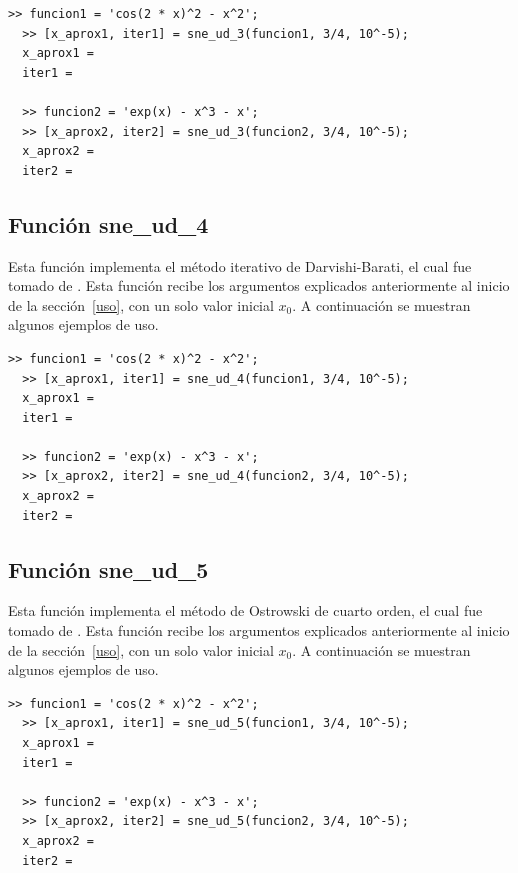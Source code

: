\documentclass[12pt]{article}
\begin{document}
\begin{minipage}{\linewidth}
\begin{lstlisting}[frame = single]
  >> funcion1 = 'cos(2 * x)^2 - x^2';
  >> [x_aprox1, iter1] = sne_ud_3(funcion1, 3/4, 10^-5);
  x_aprox1 = 
  iter1 = 

  >> funcion2 = 'exp(x) - x^3 - x';
  >> [x_aprox2, iter2] = sne_ud_3(funcion2, 3/4, 10^-5);
  x_aprox2 = 
  iter2 = 

\end{lstlisting}
\end{minipage}

\subsection{Función sne\_ud\_4}
Esta función implementa el método iterativo de Darvishi-Barati, el cual fue tomado de \cite{kiran2015performance}. Esta función recibe los argumentos explicados anteriormente al inicio de la sección~\ref{uso}, con un solo valor inicial $x_{0}$. A continuación se muestran algunos ejemplos de uso.

\begin{minipage}{\linewidth}
\begin{lstlisting}[frame = single]
  >> funcion1 = 'cos(2 * x)^2 - x^2';
  >> [x_aprox1, iter1] = sne_ud_4(funcion1, 3/4, 10^-5);
  x_aprox1 = 
  iter1 = 

  >> funcion2 = 'exp(x) - x^3 - x';
  >> [x_aprox2, iter2] = sne_ud_4(funcion2, 3/4, 10^-5);
  x_aprox2 = 
  iter2 = 

\end{lstlisting}
\end{minipage}

\subsection{Función sne\_ud\_5}
Esta función implementa el método de Ostrowski de cuarto orden, el cual fue tomado de \cite{behl2015construction}. Esta función recibe los argumentos explicados anteriormente al inicio de la sección~\ref{uso}, con un solo valor inicial $x_{0}$. A continuación se muestran algunos ejemplos de uso.

\begin{minipage}{\linewidth}
\begin{lstlisting}[frame = single]
  >> funcion1 = 'cos(2 * x)^2 - x^2';
  >> [x_aprox1, iter1] = sne_ud_5(funcion1, 3/4, 10^-5);
  x_aprox1 = 
  iter1 = 

  >> funcion2 = 'exp(x) - x^3 - x';
  >> [x_aprox2, iter2] = sne_ud_5(funcion2, 3/4, 10^-5);
  x_aprox2 = 
  iter2 = 

\end{lstlisting}
\end{minipage}
\end{document}
